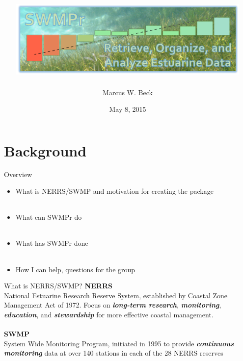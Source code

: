 \documentclass[serif]{beamer}\usepackage[]{graphicx}\usepackage[]{color}
\newcommand{\Bigtxt}[1]{\textbf{\textit{#1}}}
\begin{document}
\title[SWMPr for estuarine time series]{\includegraphics[width=0.9\textwidth]{fig/swmpr_logo.png}}

\author[M. Beck]{Marcus W. Beck}

\date{May 8, 2015}


\begin{frame}
\titlepage
\end{frame}

\section{Background}

\begin{frame}{Overview}
\begin{itemize}
\item What is NERRS/SWMP and motivation for creating the package \\~\\
\item What can SWMPr do \\~\\
\item What has SWMPr done \\~\\
\item How I can help, questions for the group
\end{itemize}
\end{frame}

\begin{frame}{What is NERRS/SWMP?}{}
{\bf NERRS}\\
National Estuarine Research Reserve System, established by Coastal Zone Management Act of 1972. Focus on \Bigtxt{long-term research}, \Bigtxt{monitoring}, \Bigtxt{education}, and \Bigtxt{stewardship} for more effective coastal management.\\~\\
{\bf SWMP}\\
System Wide Monitoring Program, initiated in 1995 to provide \Bigtxt{continuous monitoring} data at over 140 stations in each of the 28 NERRS reserves \\~\\
\end{frame}
\end{document}
